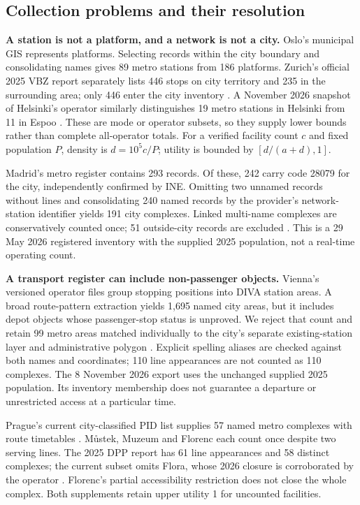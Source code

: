 \subsection{Collection problems and their resolution}
\textbf{A station is not a platform, and a network is not a city.}
Oslo's municipal GIS represents platforms. Selecting records within the city
boundary and consolidating names gives 89 metro stations from 186 platforms.
Zurich's official 2025 VBZ report separately lists 446 stops on city territory
and 235 in the surrounding area; only 446 enter the city inventory
\cite{oslo,vbz}. A November 2026 snapshot of Helsinki's operator similarly
distinguishes 19 metro stations in Helsinki from 11 in Espoo \cite{helsinki}.
These are mode or operator subsets, so they supply
lower bounds rather than complete all-operator totals. For a verified facility
count $c$ and fixed population $P$, density is $d=10^5c/P$; utility is bounded by
$[d/(a+d),1]$.

Madrid's metro register contains 293 records. Of these, 242 carry code 28079 for the city, independently confirmed by INE. Omitting two unnamed records without lines and consolidating 240 named records by the provider's network-station identifier yields 191 city complexes. Linked multi-name complexes are conservatively counted once; 51 outside-city records are excluded \cite{madridmetro,inecodes}. This is a 29 May 2026 registered inventory with the supplied 2025 population, not a real-time operating count.

\textbf{A transport register can include non-passenger objects.}
Vienna's versioned operator files group stopping positions into DIVA station
areas. A broad route-pattern extraction yields 1,695 named city areas, but it
includes depot objects whose passenger-stop status is unproved. We reject that
count and retain 99 metro areas matched individually to the city's separate
existing-station layer and administrative polygon \cite{viennaogd,viennagis}.
Explicit spelling aliases are checked against both names and coordinates;
110 line appearances are not counted as 110 complexes. The 8 November 2026
export uses the unchanged supplied 2025 population. Its inventory membership
does not guarantee a departure or unrestricted access at a particular time.

Prague's current city-classified PID list supplies 57 named metro complexes
with route timetables \cite{pidmetro}. M\r{u}stek, Muzeum and Florenc each
count once despite two serving lines. The 2025 DPP report has 61 line
appearances and 58 distinct complexes; the current subset omits Flora,
whose 2026 closure is corroborated by the operator \cite{dpp2025,floraclose}.
Florenc's partial accessibility restriction does not close the whole complex.
Both supplements retain upper utility 1 for uncounted facilities.

